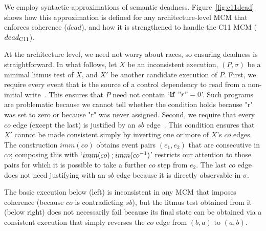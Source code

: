 We employ syntactic approximations of semantic deadness.
Figure~\ref{fig:c11dead} shows how this approximation is defined
for any architecture-level MCM that enforces coherence
($dead$), and how it is strengthened to handle the C11 MCM
($dead_{\rm C11}$).

At the architecture level, we need not worry about races, so ensuring
deadness is straightforward. In what follows, let $X$ be an
inconsistent execution, $(P,\sigma)$ be a minimal litmus test of $X$,
and $X'$ be another candidate execution of $P$. First, we require every
event that is the source of a control dependency to read from a
non-initial write~. This ensures that $P$ need not
contain `$\mathbf{if}~"r"=0$'. Such programs are problematic because
we cannot tell whether the condition holds because "r" was set to zero
or because "r" was never assigned. Second, we require that every $co$
edge (except the last) is justified by an $sb$
edge~. This condition ensures that $X'$ cannot
be made consistent simply by inverting one or more of $X$'s $co$
edges. The construction $imm(co)$ obtains event pairs $(e_1,e_2)$ that
are consecutive in $co$; composing this with
`$imm(co)\mathbin{;} imm(co^{-1})$' restricts our attention to those pairs
for which it is possible to take a further $co$ step from $e_2$. The
last $co$ edge does not need justifying with an $sb$ edge because it
is directly observable in $\sigma$.
%
\begin{Example} 
\label{ex:badtest_co}
The basic execution below (left) is inconsistent in any MCM that
imposes coherence (because $co$ is contradicting $sb$), but the litmus
test obtained from it (below right) does not necessarily fail because
its final state can be obtained via a consistent execution that simply
reverses the $co$ edge from $(b,a)$ to $(a,b)$.
%
\begin{center}
\end{center}
\end{Example}
